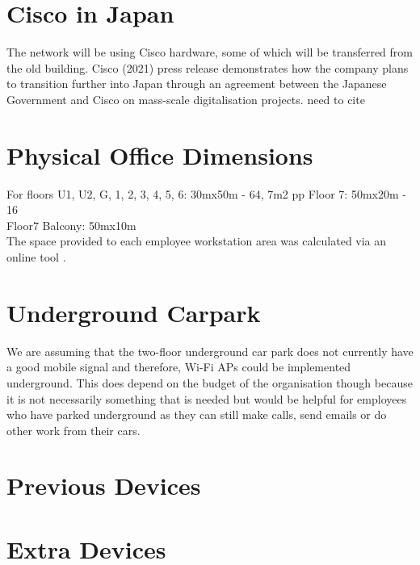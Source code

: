 \section{Cisco in Japan}
The network will be using Cisco hardware, some of which will be transferred from the old 
building. Cisco (2021) press release demonstrates how the company plans to transition further into Japan through an agreement between the Japanese Government and Cisco on mass-scale digitalisation projects.
need to cite \parencite{cisco-japan}
\section{Physical Office Dimensions}
For floors U1, U2, G, 1, 2, 3, 4, 5, 6: 30mx50m - 64, 7m2 pp
Floor 7: 50mx20m - 16 \\
Floor7 Balcony: 50mx10m \\
The space provided to each employee workstation area was calculated via an online tool \parencite{floor-space}.
\section{Underground Carpark}
We are assuming that the two-floor underground car park does not currently have a good mobile signal and therefore, Wi-Fi APs could be implemented underground. This does depend on the budget of the organisation though because it is not necessarily something that is needed but would be helpful for employees who have parked underground as they can still make calls, send emails or do other work from their cars.
\section{Previous Devices}
\section{Extra Devices}